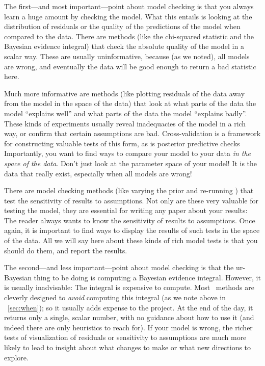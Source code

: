 \documentclass[12pt,twoside,pdftex]{article}
\newcommand{\MCMC}{\acronym{MCMC}}
\begin{document}
The first---and most important---point about model checking is that
you always learn a huge amount by checking the model.
What this entails is looking at the distribution of residuals or the
quality of the predictions of the model when compared to the data.
There are methods (like the chi-squared statistic and the Bayesian
evidence integral) that check the absolute quality of the model in a
scalar way.
These are usually uninformative, because (as we noted), all models are
wrong, and eventually the data will be good enough to return a bad
statistic here.

Much more informative are methods (like plotting residuals of the data
away from the model in the space of the data) that look at what parts
of the data the model ``explains well'' and what parts of the data the
model ``explains badly''.
These kinds of experiments usually reveal inadequacies of the model in
a rich way, or confirm that certain assumptions are bad.
Cross-validation
is a framework for constructing
valuable tests of this form, as is posterior predictive checks
Importantly, you want to find ways to compare your model to your data
\emph{in the space of the data}.
Don't just look at the parameter space of your model!
It is the data that really exist, especially when all models are wrong!

There are model checking methods (like varying the prior and
re-running \MCMC) that test the sensitivity of results to assumptions.
Not only are these very valuable for testing the model, they are
essential for writing any paper about your results: The reader always
wants to know the sensitivity of results to assumptions.
Once again, it is important to find ways to display the results of
such tests in the space of the data.
All we will say here about these kinds of rich model tests is that you
should do them, and report the results.

The second---and less important---point about model checking is that
the ur-Bayesian thing to be doing is computing a Bayesian evidence
integral.
However, it is usually inadvisable:
The integral is expensive to compute.
Most \MCMC\ methods are cleverly designed to \emph{avoid} computing this
integral (as we note above in \sectionname~\ref{sec:when}); so it usually adds
expense to the project.
At the end of the day, it returns only a single, scalar number, with
no guidance about how to use it (and indeed there are only heuristics
to reach for).
If your model is wrong, the richer tests of visualization of residuals
or sensitivity to assumptions are much more likely to lead to insight
about what changes to make or what new directions to explore.
\end{document}
